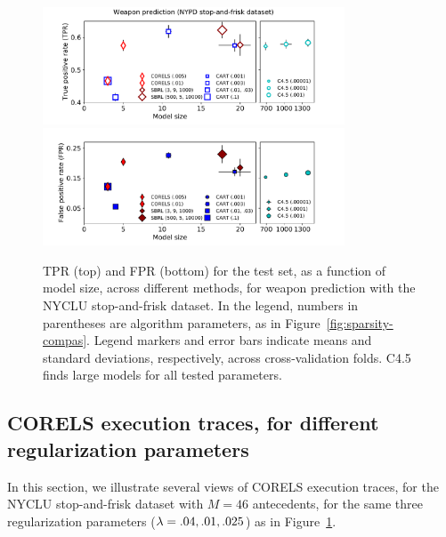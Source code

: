 \begin{figure}[t!]
\begin{center}
\includegraphics[trim={17mm, 0mm, 27mm, 0mm},
width=0.8\textwidth]{figs/cpw-noloc-sparsity-tpr.pdf}
\includegraphics[trim={17mm, 10mm, 27mm, 4mm},
width=0.8\textwidth]{figs/cpw-noloc-sparsity-fpr.pdf}
\end{center}
\caption{TPR (top) and FPR (bottom)
for the test set, as a function of model size, across different methods,
for weapon prediction with the NYCLU stop-and-frisk dataset.
%
In the legend, numbers in parentheses are algorithm parameters,
as in Figure~\ref{fig:sparsity-compas}.
%
Legend markers and error bars indicate means and standard deviations,
respectively, across cross-validation folds.
%
%
C4.5 finds large models for all tested parameters.
}
\label{fig:sparsity-weapon}
\end{figure}

\subsection{CORELS execution traces, for different regularization parameters}
\label{sec:reg-param}
In this section, we illustrate several views of CORELS execution traces,
for the NYCLU stop-and-frisk dataset with ${M = 46}$ antecedents,
for the same three regularization parameters (${{\lambda} = .04, .01, .025}$)
as in Figure~\ref{fig:sparsity-weapon}.

